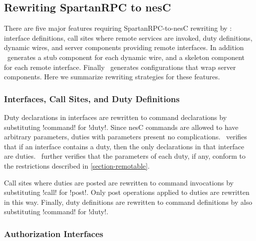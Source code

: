 \subsection{Rewriting SpartanRPC to nesC}

There are five major features requiring SpartanRPC-to-nesC rewriting by \Sprocket: interface
definitions, call sites where remote services are invoked, duty definitions, dynamic wires, and
server components providing remote interfaces. In addition \Sprocket\ generates a stub component
for each dynamic wire, and a skeleton component for each remote interface. Finally \Sprocket\
generates configurations that wrap server components. Here we summarize rewriting strategies for
these features.


\subsubsection{Interfaces, Call Sites, and Duty Definitions}

Duty declarations in interfaces are rewritten to command declarations by substituting !command!
for !duty!. Since nesC commands are allowed to have arbitrary parameters, duties with parameters
present no complications. \Sprocket\ verifies that if an interface contains a duty, then the
only declarations in that interface are duties. \Sprocket\ further verifies that the parameters
of each duty, if any, conform to the restrictions described in \autoref{section-remotable}.


Call sites where duties are posted are rewritten to command invocations by substituting !call!
for !post!. Only post operations applied to duties are rewritten in this way. Finally, duty
definitions are rewritten to command definitions by also substituting !command! for !duty!.

\subsubsection{Authorization Interfaces}

